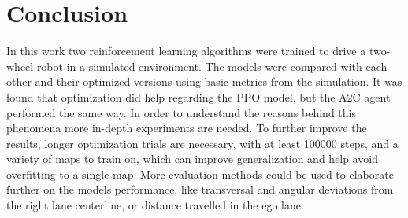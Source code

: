 \documentclass{article}
\begin{document}
\section{\large{Conclusion}}
In this work two reinforcement learning algorithms were trained to drive a two-wheel robot in a simulated environment. 
The models were compared with each other and their optimized versions using basic metrics from the simulation. 
It was found that optimization did help regarding the PPO model, but the A2C agent performed the same way. In order to understand the reasons behind this phenomena more in-depth experiments are needed. 
To further improve the results, longer optimization trials are necessary, with at least 100000 steps, and a variety of maps to train on, which can improve generalization and help avoid overfitting to a single map.
More evaluation methods could be used to elaborate further on the models performance, like transversal and angular deviations from the right lane centerline, or distance travelled in the ego lane.\\



%

%
\end{document}
